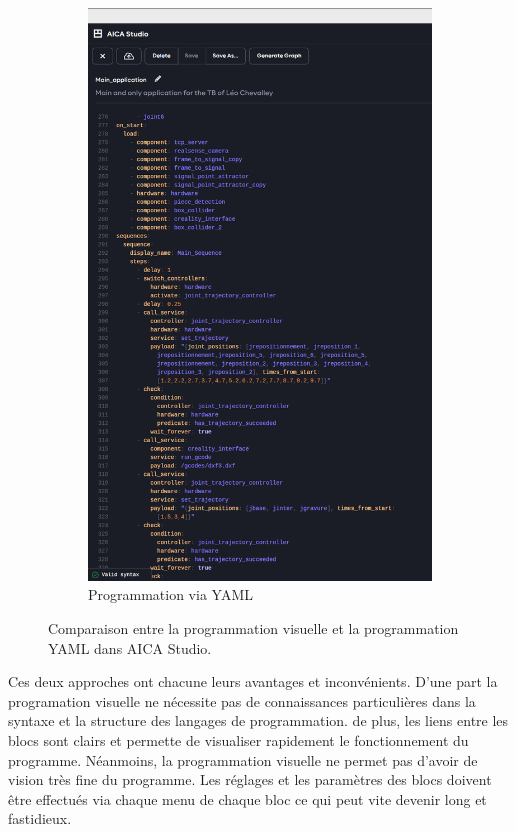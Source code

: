 \begin{figure}[H]
\begin{subfigure}{0.48\textwidth}
        \includegraphics[width=0.95\linewidth]{assets/figures/AICA_Yaml.png}
        \caption{Programmation via YAML}
        \label{fig:prog_yaml}
    \end{subfigure}
    \caption{Comparaison entre la programmation visuelle et la programmation YAML dans AICA Studio.}
    \label{fig:comparaison_yaml_visuel}
\end{figure}

Ces deux approches ont chacune leurs avantages et inconvénients.
D'une part la programation visuelle ne nécessite pas de connaissances particulières dans la syntaxe et la structure des langages de programmation. de plus, les liens entre les blocs sont clairs et permette de visualiser rapidement le fonctionnement du programme. Néanmoins, la programmation visuelle ne permet pas d'avoir de vision très fine du programme. Les réglages et les paramètres des blocs doivent être effectués via chaque menu de chaque bloc ce qui peut vite devenir long et fastidieux.

